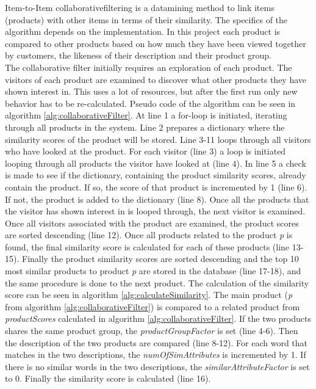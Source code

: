 Item-to-Item \gls{collaborativefiltering} is a \gls{datamining} method to link items (products) with other items in terms of their similarity.
The specifics of the algorithm depends on the implementation. In this project each product is compared to other products based on how much they have been viewed together by customers, the likeness of their description and their product group. \\
The collaborative filter initially requires an exploration of each product. The visitors of each product are examined to discover what other products they have shown interest in. This uses a lot of resources, but after the first run only new behavior has to be re-calculated. Pseudo code of the algorithm can be seen in algorithm \ref{alg:collaborativeFilter}. At line 1 a for-loop is initiated, iterating through all products in the system. Line 2 prepares a dictionary where the similarity scores of the product will be stored. Line 3-11 loops through all visitors who have looked at the product. For each visitor (line 3) a loop is initiated looping through all products the visitor have looked at (line 4). In line 5 a check is made to see if the dictionary, containing the product similarity scores, already contain the product. If so, the score of that product is incremented by 1 (line 6). If not, the product is added to the dictionary (line 8). Once all the products that the visitor has shown interest in is looped through, the next visitor is examined. Once all visitors associated with the product are examined, the product scores are sorted descending (line 12). Once all products related to the product \textit{p} is found, the final similarity score is calculated for each of these products (line 13-15). Finally the product similarity scores are sorted descending and the top 10 most similar products to product \textit{p} are stored in the database (line 17-18), and the same procedure is done to the next product. The calculation of the similarity score can be seen in algorithm \ref{alg:calculateSimilarity}. The main product (\textit{p} from algorithm \ref{alg:collaborativeFilter}) is compared to a related product from \textit{productScores} calculated in algorithm \ref{alg:collaborativeFilter}. If the two products shares the same product group, the \textit{productGroupFactor} is set (line 4-6). Then the description of the two products are compared (line 8-12). For each word that matches in the two descriptions, the \textit{numOfSimAttributes} is incremented by 1. If there is no similar words in the two descriptions, the \textit{similarAttributeFactor} is set to 0. Finally the similarity score is calculated (line 16).\\\\

